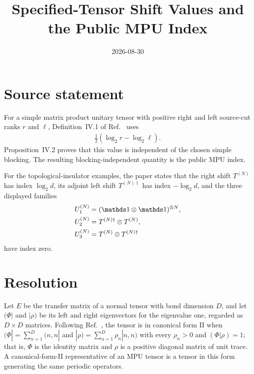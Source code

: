 \documentclass{article}
\title{Specified-Tensor Shift Values and the Public MPU Index}
\author{}
\date{2026-08-30}
\begin{document}
\maketitle
{}

\section{Source statement}

For a simple matrix product unitary tensor with positive right and left
source-cut ranks $r$ and $\ell$, Definition~IV.1 of
Ref.~\cite{Cirac2017MPU} uses
\begin{align}
    \frac12(\log_2 r-\log_2\ell).
    \label{eq:mpu_shift_specified_tensor_index_scope_expression}
\end{align}
Proposition~IV.2 proves that this value is independent of the chosen simple
blocking. The resulting blocking-independent quantity is the public MPU
index.

For the topological-insulator examples, the paper states that the right shift
$T^{(N)}$ has index $\log_2 d$, its adjoint left shift $T^{(N)\dagger}$ has
index $-\log_2 d$, and the three displayed families
\begin{align}
    U_1^{(N)} & = (\Id\otimes\Id)^{\otimes N},
    \label{eq:mpu_shift_specified_tensor_index_scope_1} \\
    U_2^{(N)} & = T^{(N)\dagger}\otimes T^{(N)},
    \label{eq:mpu_shift_specified_tensor_index_scope_2} \\
    U_3^{(N)} & = T^{(N)}\otimes T^{(N)\dagger}
    \label{eq:mpu_shift_specified_tensor_index_scope_families}
\end{align}
have index zero.

\section{Resolution}

Let $E$ be the transfer matrix of a normal tensor with bond dimension $D$,
and let $(\Phi|$ and $|\rho)$ be its left and right eigenvectors for the
eigenvalue one, regarded as $D\times D$ matrices. Following
Ref.~\cite{Cirac2017MPU}, the tensor is in canonical form II when
$(\Phi|=\sum_{n=1}^D(n,n|$ and $|\rho)=\sum_{n=1}^D\rho_n|n,n)$ with every
$\rho_n>0$ and $(\Phi|\rho)=1$; that is, $\Phi$ is the identity matrix and
$\rho$ is a positive diagonal matrix of unit trace. A canonical-form-II
representative of an MPU tensor is a tensor in this form generating the same
periodic operators.
\end{document}
